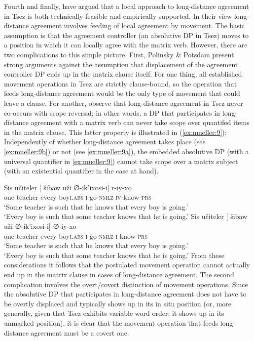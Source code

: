 \documentclass[output=paper
,modfonts
,nonflat]{langsci/langscibook}
\begin{document}
	Fourth and finally, \cite{PolinskyPotsdam:01} have argued that a
	local approach to long-distance agreement in Tsez is both technically
	feasible and empirically supported. In their view long-distance agreement involves feeding of local agreement by movement. The basic
	assumption is that the agreement controller (an absolutive DP in Tsez)
	moves to a position in which it can locally agree with the matrix
	verb. However, there are two complications to this simple
	picture. First, Polinsky \& Potsdam present strong arguments against
	the assumption that displacement of the agreement controller DP ends
	up in the matrix clause itself. For one thing, all established
	movement operations in Tsez are strictly clause-bound, so the 
	operation that feeds long-distance agreement would be the only type of
	movement that could leave a clause. For another,
	\cite{PolinskyPotsdam:01} observe that long-distance
	agreement in Tsez never co-occurs with scope reversal; in other words,
	a DP that participates in long-distance agreement with a matrix verb
	can never take scope over quantifed items in the matrix clause.
	This latter property is illustrated in (\ref{ex:mueller:9}): Independently of whether
	long-distance agreement takes place (see \ref{ex:mueller:9b}) or not (see
	\ref{ex:mueller:9a}), the embedded absolutive DP (with a universal quantifier in
	\ref{ex:mueller:9}) cannot take scope over a  matrix subject (with an existential
	quantifier in the case at hand). 
	
	\ea \label{ex:mueller:9}  \label{scope32}
	\ea \label{ex:mueller:9a}
	\gll Sis u\v{c}iteler [\sub{$\alpha$} \v{s}ibaw u\v{z}i ∅-ik'ixosi-\textbeltl i] r-iy-xo \\
	one teacher {} every boy{\scshape i}.{\scshape abs} {\scshape i}-go-{\scshape nmlz} {\scshape iv}-know-{\scshape prs}  \\
	\glt `Some teacher is such that he knows that every boy is going.'\\
	`Every boy is such that some teacher knows that he is going.'
	\ex \label{ex:mueller:9b}
	\gll Sis u\v{c}iteler [\sub{$\alpha$} \v{s}ibaw u\v{z}i ∅-ik'ixosi-\textbeltl i] ∅-iy-xo \\
	one teacher {} every boy{\scshape i}.{\scshape abs} {\scshape i}-go-{\scshape nmlz} {\scshape i}-know-{\scshape prs}  \\
	\glt      `Some teacher is such that he knows that every boy is going.'\\
	`Every boy is such that some teacher knows that he is going.'
	\z
	\z
	From these considerations it follows that the postulated movement operation
	cannot actually end up in the matrix clause in cases of long-distance
	agreement. The second complication involves the overt/covert
	distinction of movement operations. Since the absolutive DP that participates in
	long-distance agreement does not have to be overtly
	displaced and typically shows up in its in situ position (or, more generally, given
	that Tsez exhibits variable word order: it shows up in its unmarked position),
	it is clear that the movement operation that feeds long-distance
	agreement must be a covert one. 
	
\end{document}
